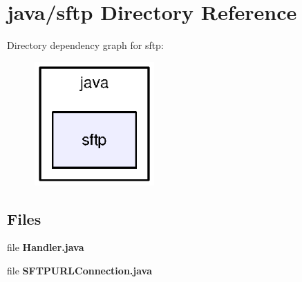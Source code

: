 \section{java/sftp Directory Reference}
\label{dir_1fc2918f839e083ad693d50cbc884b82}
Directory dependency graph for sftp\-:\nopagebreak
\begin{figure}[H]
\begin{center}
\leavevmode
\includegraphics[width=130pt]{dir_1fc2918f839e083ad693d50cbc884b82_dep}
\end{center}
\end{figure}
\subsection*{Files}
\begin{DoxyCompactItemize}
\item 
file {\bf Handler.\-java}
\item 
file {\bf S\-F\-T\-P\-U\-R\-L\-Connection.\-java}
\end{DoxyCompactItemize}

